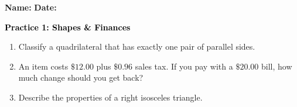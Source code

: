 \documentclass[12pt, letterpaper, fleqn]{article}
\begin{document}
\textbf{Name:} \underline{\hspace{5cm}}
\hfill
\textbf{Date:} \underline{\hspace{3cm}}\\

\begin{tcolorbox}[colback=customteal!20]
    \large\textcolor{black}{\textbf{Practice 1: Shapes \& Finances}}
\end{tcolorbox}
\begin{enumerate}[itemsep=3.5cm, leftmargin=0.6cm]
\item Classify a quadrilateral that has exactly one pair of parallel sides.
\vspace{3.5cm}
\item An item costs $\$12.00$ plus $\$0.96$ sales tax. If you pay with a $\$20.00$ bill, how much change should you get back?
\vspace{3.5cm}
\item Describe the properties of a right isosceles triangle.
\end{enumerate}
\end{document}
